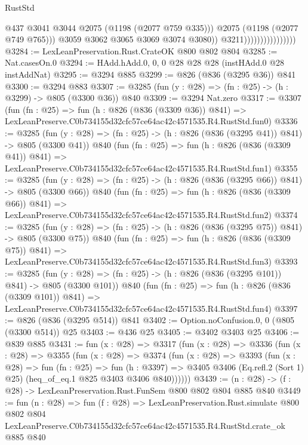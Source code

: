 \begin{lexlean}{RustStd}
\begin{coremodule}
                                            @437
                                            @3041
                                            @3044
                                            @2075
                                            (@1198 (@2077 @759 @335)))
                                          @2075
                                          (@1198 (@2077 @749 @765)))
                                        @3059
                                        @3062
                                        @3065
                                        @3069
                                        @3074
                                        @3080))
                                    @3211))))))))))))))))
@3284 := LexLeanPreservation.Rust.CrateOK @800 @802 @804
@3285 := Nat.casesOn.{0}
@3294 := HAdd.hAdd.{0, 0, 0} @28 @28 @28 (instHAdd.{0} @28 instAddNat)
@3295 := @3294 @885
@3299 := @826 (@836 (@3295 @36)) @841
@3300 := @3294 @883
@3307 := @3285 (fun (y : @28) => (fn : @25) -> (h : @3299) -> @805 (@3300 @36)) @840
@3309 := @3294 Nat.zero
@3317 := @3307
    (fun (fn : @25) =>
    fun (h : @826 (@836 (@3309 @36)) @841) =>
    LexLeanPreserve.C0b734155d32cfc57ce64ac42c4571535.R4.RustStd.fun0)
@3336 := @3285
    (fun (y : @28) => (fn : @25) -> (h : @826 (@836 (@3295 @41)) @841) -> @805 (@3300 @41))
    @840
    (fun (fn : @25) =>
    fun (h : @826 (@836 (@3309 @41)) @841) =>
    LexLeanPreserve.C0b734155d32cfc57ce64ac42c4571535.R4.RustStd.fun1)
@3355 := @3285
    (fun (y : @28) => (fn : @25) -> (h : @826 (@836 (@3295 @66)) @841) -> @805 (@3300 @66))
    @840
    (fun (fn : @25) =>
    fun (h : @826 (@836 (@3309 @66)) @841) =>
    LexLeanPreserve.C0b734155d32cfc57ce64ac42c4571535.R4.RustStd.fun2)
@3374 := @3285
    (fun (y : @28) => (fn : @25) -> (h : @826 (@836 (@3295 @75)) @841) -> @805 (@3300 @75))
    @840
    (fun (fn : @25) =>
    fun (h : @826 (@836 (@3309 @75)) @841) =>
    LexLeanPreserve.C0b734155d32cfc57ce64ac42c4571535.R4.RustStd.fun3)
@3393 := @3285
    (fun (y : @28) => (fn : @25) -> (h : @826 (@836 (@3295 @101)) @841) -> @805 (@3300 @101))
    @840
    (fun (fn : @25) =>
    fun (h : @826 (@836 (@3309 @101)) @841) =>
    LexLeanPreserve.C0b734155d32cfc57ce64ac42c4571535.R4.RustStd.fun4)
@3397 := @826 (@836 (@3295 @514)) @841
@3402 := Option.noConfusion.{0, 0} (@805 (@3300 @514)) @25
@3403 := @436 @25
@3405 := @3402 @3403 @25
@3406 := @839 @885
@3431 := fun (x : @28) =>
  @3317
    (fun (x : @28) =>
    @3336
      (fun (x : @28) =>
      @3355
        (fun (x : @28) =>
        @3374
          (fun (x : @28) =>
          @3393
            (fun (x : @28) =>
            fun (fn : @25) =>
            fun (h : @3397) =>
            @3405 @3406 (Eq.refl.{2} (Sort 1) @25) (heq_of_eq.{1} @825 @3403 @3406 @840))))))
@3439 := (n : @28) -> (f : @28) -> LexLeanPreservation.Rust.FunSem @800 @802 @804 @885 @840
@3449 := fun (n : @28) =>
  fun (f : @28) =>
  LexLeanPreservation.Rust.simulate
    @800
    @802
    @804
    LexLeanPreserve.C0b734155d32cfc57ce64ac42c4571535.R4.RustStd.crate_ok
    @885
    @840
\end{coremodule}
\end{lexlean}
